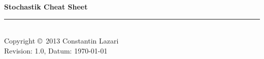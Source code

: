 \documentclass[10pt,landscape]{scrartcl}
\begin{document}
	\raggedright
	\footnotesize
	\begin{multicols}{3}


	\setlength{\premulticols}{1pt}
	\setlength{\postmulticols}{1pt}
	\setlength{\multicolsep}{1pt}
	\setlength{\columnsep}{2pt}
	\newlength{\MyLenA}
	\newlength{\MyLenB}

	\begin{center}
	\Large{\textbf{Stochastik Cheat Sheet}} \\
	\end{center}

	

	

	

	\rule{0.3\linewidth}{0.25pt}\\
	\scriptsize
	Copyright \copyright\ 2013 Constantin Lazari\\
	Revision: 1.0, Datum: \today\\
	\end{multicols}
\end{document}

